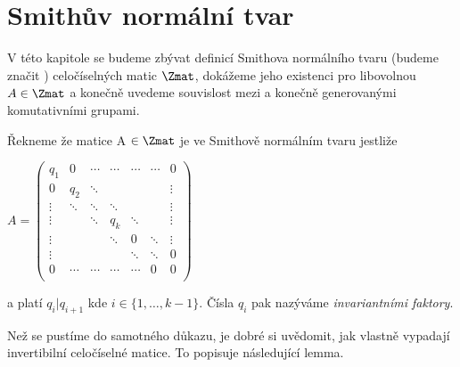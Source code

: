 \chapter{Smithův normální tvar}
\setcounter{page}{1}

V této kapitole se budeme zbývat definicí Smithova normálního tvaru (budeme značit \snf) celočíselných matic $\Zmat$, dokážeme jeho existenci pro libovolnou $A \in \Zmat$ a konečně uvedeme souvislost mezi \snf  a konečně generovanými komutativními grupami.

\begin{defi}Řekneme že matice A $ \in \Zmat $ je ve Smithově normálním tvaru jestliže
\begin{center}
$ A =
    \begin{pmatrix}
        q_1     & 0      & \cdots & \cdots & \cdots & \cdots & 0      \\
        0       & q_2    & \ddots &        &        &        & \vdots \\
        \vdots  & \ddots & \ddots & \ddots &        &        & \vdots \\
        \vdots  &        & \ddots & q_k    & \ddots &        & \vdots \\
        \vdots  &        &        & \ddots & 0      & \ddots & \vdots \\
        \vdots  &        &        &        & \ddots & \ddots & 0      \\
        0       & \cdots & \cdots & \cdots & \cdots & 0      & 0      \\
    \end{pmatrix}
$
\end{center}
a platí $q_i | q_{i+1}$ kde $i \in \{1, \dots, k-1\}$. Čísla $q_i$ pak nazýváme
\textit{invariantními faktory}.
\end{defi}

Než se pustíme do samotného důkazu, je dobré si uvědomit, jak vlastně vypadají
invertibilní celočíselné matice. To popisuje následující lemma.

